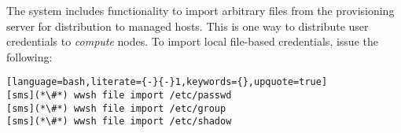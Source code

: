 The \Warewulf{} system includes functionality to import arbitrary files from
the provisioning server for distribution to managed hosts. This is one way to
distribute user credentials to {\em compute} nodes. To import local file-based
credentials, issue the following:

\begin{lstlisting}[language=bash,literate={-}{-}1,keywords={},upquote=true]
[sms](*\#*) wwsh file import /etc/passwd
[sms](*\#*) wwsh file import /etc/group
[sms](*\#*) wwsh file import /etc/shadow

\end{lstlisting}
